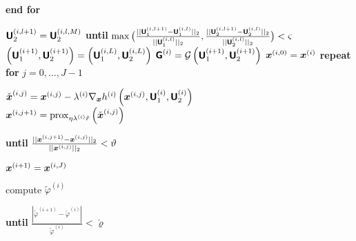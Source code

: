 \begin{algorithm}[]
\begin{algorithmic}[1]
\State
\quad\quad
\textbf{end for}\label{algo:step:endu2}
\vspace*{0.1cm}

\State
\quad\quad
$\boldsymbol{\mathsf{U}}_2^{(i,l+1)} = \boldsymbol{\mathsf{U}}_2^{(i,l,M)}$
\vspace*{0.1cm}
%
\State
\quad
{{\textbf{until} $ \max \big(\frac{|| \boldsymbol{\mathsf{U}}_1^{(i,l+1)} -\boldsymbol{\mathsf{U}}_1^{(i,l)}||_2}{|| \boldsymbol{\mathsf{U}}_1^{(i,l)}||_2}, \frac{|| \boldsymbol{\mathsf{U}}_2^{(i,l+1)} -\boldsymbol{\mathsf{U}}_2^{(i,l)}||_2} { || \boldsymbol{\mathsf{U}}_2^{(i,l)}||_2} \big) < \varsigma$} }\label{algo:step:stopDDEs} 
\vspace*{0.15cm}
%
\State %
\quad
$\left(\boldsymbol{\mathsf{U}}_1^{(i+1)}, \boldsymbol{\mathsf{U}}_2^{(i+1)} \right) = \left( \boldsymbol{\mathsf{U}}_1^{(i,L)}, \boldsymbol{\mathsf{U}}_2^{(i,L)} \right)$
%
\State
\label{algo:step:updateG}
\quad $\boldsymbol{\mathsf{G}}^{(i)}=\mathcal{G}\left( \boldsymbol{\mathsf{U}}^{(i+1)}_1,\boldsymbol{\mathsf{U}}^{(i+1)}_2\right)$
%
\State
\quad
$\boldsymbol{x}^{(i,0)} = \boldsymbol{x}^{(i)}$
\vspace*{0.1cm}
%
\State
\quad
{{\textbf{repeat for} $j = 0, \ldots, J-1$}} {~}\label{algo:step:startim}

\State\label{algo:gx} 
\quad\quad\quad

$\check{\boldsymbol{x}}^{(i,j)} =\boldsymbol{x}^{(i,j)}- \lambda^{(i)} {\nabla_{\boldsymbol{x}} h^{(i)}\left( \boldsymbol{x}^{(i,j)}, \boldsymbol{\mathsf{U}}_1^{(i)}, \boldsymbol{\mathsf{U}}_2^{(i)} \right)}$ ~	\\
\quad\quad
\label{algo:step:proxx} 
$\boldsymbol{x}^{(i,j+1)} = \operatorname{prox}_{\eta\lambda^{(i)} \tilde{r}} \left( \check{\boldsymbol{x}}^{(i,j)} \right)$ ~

\State
\quad
{{\textbf{until} $\frac{|| \boldsymbol{x}^{(i,j+1)} -\boldsymbol{x}^{(i,j)}||_2}{ || \boldsymbol{x}^{(i,j)}||_2 }< \vartheta$\label{algo:step:endim}}}
\vspace*{0.1cm}

\State
\quad
$\boldsymbol{x}^{(i+1)}= \boldsymbol{x}^{(i, J)}$

\vspace*{0.1cm}

\State 
\quad
compute $\tilde{\varphi}^{(i)}$
\vspace*{0.1cm}

\State
{{\textbf{until}   $\frac{{|\tilde{\varphi}^{(i+1)} -\tilde{\varphi}^{(i)}|}}{ {\tilde{\varphi}^{(i)}}} < \check{\varrho}$} }

\end{algorithmic}
\end{algorithm}